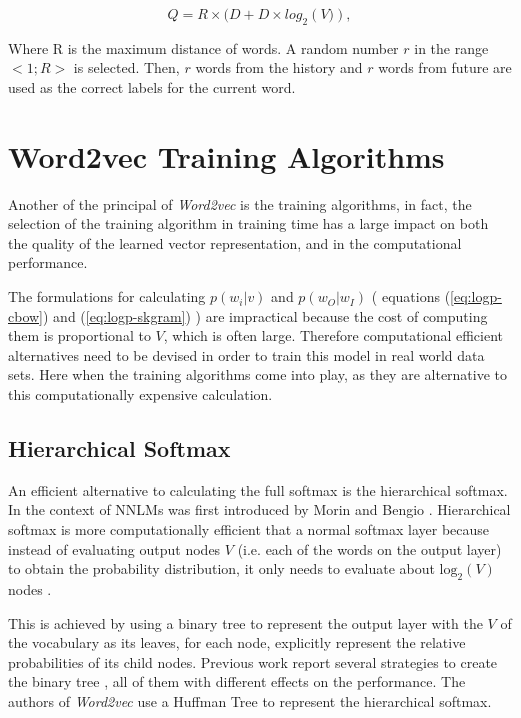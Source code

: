\begin{equation}
  Q = R \times (D + D \times log_2 \left(V)\right),  
\end{equation}

Where R is the maximum distance of words. A random number $r$ in the range $<
1; R >$ is selected. Then, $r$ words from the history and $r$ words from
future are used as the correct labels for the current word.
 

\section{Word2vec Training Algorithms}
\label{sec:word2v-tran-algorithms}
Another of the principal of  \textit{Word2vec} is the training algorithms, in
fact, the selection of the training algorithm in training time has a large  impact on
both the quality of the learned vector representation,  and in the
computational performance.

The formulations for calculating $p(w_i|v)$ and  $p(w_O|w_I)$  ( equations
(\ref{eq:logp-cbow})  and  (\ref{eq:logp-skgram}) ) are impractical because
the cost of computing them is proportional to $V$, which is often large.
Therefore computational efficient alternatives need to be devised in order to
train this model in real world data sets. Here when the training algorithms
come into play, as they are alternative to this computationally expensive
calculation. 

\subsection{Hierarchical Softmax}
\label{sec:sub-hs}


An efficient alternative to calculating the full softmax is the hierarchical
softmax. In the context of \ac{NNLM}s was first introduced by Morin and
Bengio \cite{Morin05hierarchicalprobabilistic}. Hierarchical softmax is more
computationally efficient that a normal softmax layer because instead of
evaluating output nodes $V$ (i.e. each of the words on the output layer) to
obtain the probability distribution, it only needs to evaluate about
$\text{log}_2 \left( V \right)$ nodes \cite{MikolovSCCD13}.

This is achieved by  using a binary tree to represent the output layer with
the $V$ of the vocabulary as its leaves, for each node, explicitly represent
the relative probabilities of its child nodes. Previous work report several
strategies to create the binary tree \cite{Mnih08ascalable}, all of them with
different effects on the performance. The authors of \textit{Word2vec} use a Huffman Tree  to represent the
hierarchical softmax.

